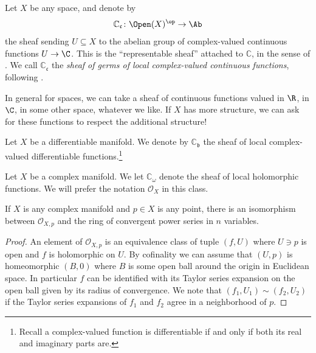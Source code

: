 \documentclass[11pt]{book}
\begin{document}
\begin{example} Let $X$ be any space, and denote by
\begin{align*}
    \mathbb{C}_{\mathfrak{c}} \colon \Open(X)^\op \to \Ab
\end{align*}
the sheaf sending $U \subseteq X$ to the abelian group of complex-valued continuous functions $U \to \C$. This is the ``representable sheaf'' attached to $\mathbb{C}$, in the sense of . We call $\mathbb{C}_{\mathfrak{c}}$ the \emph{sheaf of germs of local complex-valued continuous functions}, following \cite[p.~23]{Hirzebruch}.
\end{example}

In general for spaces, we can take a sheaf of continuous functions valued in $\R$, in $\C$, in some other space, whatever we like. If $X$ has more structure, we can ask for these functions to respect the additional structure!

\begin{example} Let $X$ be a differentiable manifold. We denote by $\mathbb{C}_{\mathfrak{b}}$ the sheaf of local complex-valued differentiable functions.\footnote{Recall a complex-valued function is differentiable if and only if both its real and imaginary parts are.}
\end{example}

\begin{example} Let $X$ be a complex manifold. We let $\mathbb{C}_{\omega}$ denote the sheaf of local holomorphic functions. We will prefer the notation $\mathcal{O}_X$ in this class.
\end{example}

\begin{proposition}\label{prop:stalk-of-OX} 
If $X$ is any complex manifold and $p\in X$ is any point, there is an isomorphism between $\mathcal{O}_{X,p}$ and the ring of convergent power series in $n$ variables.
\end{proposition}
\begin{proof} An element of $\mathcal{O}_{X,p}$ is an equivalence class of tuple $(f,U)$ where $U \ni p$ is open and $f$ is holomorphic on $U$. By cofinality we can assume that $(U,p)$ is homeomorphic $(B,0)$ where $B$ is some open ball around the origin in Euclidean space. In particular $f$ can be identified with its Taylor series expansion on the open ball given by its radius of convergence. We note that $(f_1,U_1) \sim (f_2,U_2)$ if the Taylor series expansions of $f_1$ and $f_2$ agree in a neighborhood of $p$.
\end{proof}
\end{document}
